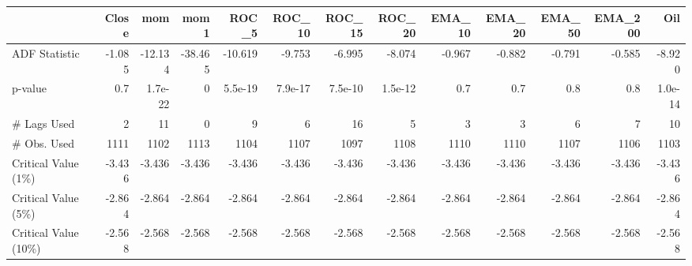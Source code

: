{\tiny
\hspace*{-2cm}\begin{tabular}{lrrrrrrrrrrrr}
\toprule
{} &        Close &           mom &         mom1 &         ROC\_5 &        ROC\_10 &        ROC\_15 &        ROC\_20 &       EMA\_10 &       EMA\_20 &       EMA\_50 &      EMA\_200 &           Oil \\
\midrule
ADF Statistic               &    -1.085 & -12.134 &   -38.465 & -10.619 & -9.753 & -6.995 & -8.074 &    -0.967 &    -0.882 &    -0.791 &    -0.585 & -8.920 \\
p-value                     &     0.7 &  1.7e-22 &     0 &  5.5e-19 &  7.9e-17 &  7.5e-10 &  1.5e-12 &     0.7 &     0.7 &     0.8 &     0.8 &  1.0e-14 \\
\# Lags Used                  &     2 &  11 &     0 &  9 &  6 &  16 &  5 &     3 &     3 &     6 &     7 &  10 \\
\# Obs. Used &  1111 &  1102 &  1113 &  1104 &  1107 &  1097 &  1108 &  1110 &  1110 &  1107 &  1106 &  1103 \\
Critical Value (1\%)         &    -3.436 & -3.436 & -3.436 &    -3.436 & -3.436 &    -3.436 & -3.436 & -3.436 & -3.436 & -3.436 & -3.436 & -3.436 \\
Critical Value (5\%)         &    -2.864 & -2.864 & -2.864 &    -2.864 & -2.864 &    -2.864 & -2.864 & -2.864 & -2.864 & -2.864 & -2.864 & -2.864 \\
Critical Value (10\%)        &    -2.568 & -2.568 & -2.568 &    -2.568 & -2.568 &    -2.568 & -2.568 & -2.568 & -2.568 & -2.568 & -2.568 & -2.568\\
\bottomrule
\end{tabular}\hspace*{-2cm}
}